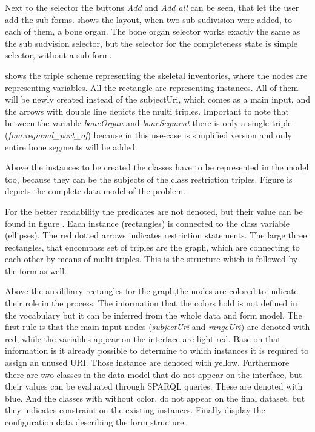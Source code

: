 
Next to the selector the buttons \textit{Add} and \textit{Add all} can be seen, that let the user add the sub forms.  shows the layout, when two sub sudivision were added, to each of them, a bone organ. The bone organ selector works exactly the same as the sub sudvision selector, but the selector for the completeness state is simple selector, without a sub form. 

 shows the triple scheme representing the skeletal inventories, where the nodes are representing variables. All the rectangle are representing instances. All of them will be newly created instead of the subjectUri, which comes as a main input, and the arrows with double line depicts the multi triples. Important to note that between the variable \textit{boneOrgan} and \textit{boneSegment} there is only a single triple (\textit{fma:regional\_part\_of}) because in this use-case is simplified version and only entire bone segments will be added. 




Above the instances to be created the classes have to be represented in the model too, because they can be the subjects of the class restriction triples.
 Figure  is depicts the complete data model of the problem.


For the better readability the predicates are not denoted, but their value can be found in figure . Each instance (rectangles) is connected to the class variable (ellipses). The red dotted arrows indicates restriction statements. The large three rectangles, that encompass set of triples are the graph, which are connecting to each other by means of multi triples. This is the structure which is followed by the form as well.




Above the auxililiary rectangles for the graph,the nodes are colored to indicate their role in the process. The information that the colors hold is not defined in the vocabulary but it can be inferred from the whole data and form model. The first rule is that the main input nodes (\textit{subjectUri} and \textit{rangeUri}) are denoted with red, while the variables appear on the interface are light red. Base on that information is it already possible to determine to which instances it is required to assign an unused URI. Those instance are denoted with yellow.
Furthermore there are two classes in the data model that do not appear on the interface, but their values can be evaluated through SPARQL queries. These are denoted with blue. And the classes with without color, do not appear on the final dataset, but they indicates constraint on the existing instances.
Finally  display the configuration data describing the form structure. 


